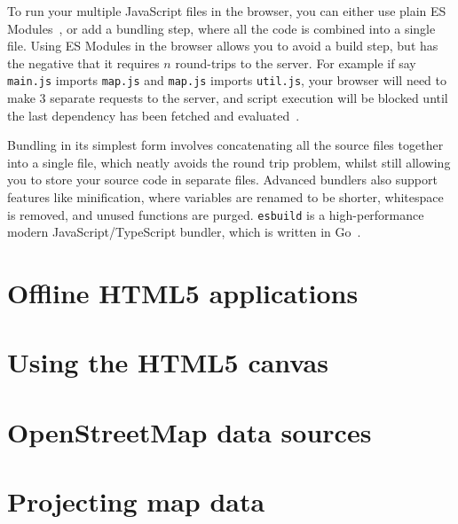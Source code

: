 \documentclass[hyphens]{final_report}
\begin{document}
To run your multiple JavaScript files in the browser, you can either use plain ES Modules~\cite{mdn-es-modules}, or add a bundling step, where all the code is combined into a single file. Using ES Modules in the browser allows you to avoid a build step, but has the negative that it requires \(n\) round-trips to the server. For example if say \texttt{main.js} imports \texttt{map.js} and \texttt{map.js} imports \texttt{util.js}, your browser will need to make 3 separate requests to the server, and script execution will be blocked until the last dependency has been fetched and evaluated~\cite{sitepoint-using-es-modules}. 

Bundling in its simplest form involves concatenating all the source files together into a single file, which neatly avoids the round trip problem, whilst still allowing you to store your source code in separate files. Advanced bundlers also support features like minification, where variables are renamed to be shorter, whitespace is removed, and unused functions are purged. \texttt{esbuild} is a high-performance modern JavaScript/TypeScript bundler, which is written in Go~\cite{esbuild}.

\section{Offline HTML5 applications}\label{sec:offline-html-applications}



\section{Using the HTML5 canvas}



\section{OpenStreetMap data sources}\label{sec:osm-data-sources}



\section{Projecting map data}\label{sec:projecting-map-data}


\end{document}
